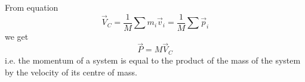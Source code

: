 \documentclass[18pt]{LectMechanics}
\begin{document}

\begin{frame}{}{}
	From equation
	\begin{equation*}
		\vec V_C = \frac{1}{M}\sum m_i \vec v_i = \frac{1}{M}\sum \vec p_i
	\end{equation*}
	we get
	\begin{equation*}
		\vec P = M\vec V_C
	\end{equation*}
	i.e. the momentum of a system is equal to the product of the
	mass of the system by the velocity of its centre of mass.

\end{frame}
\end{document}
